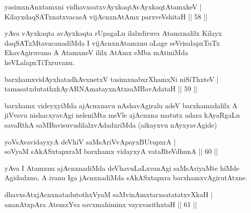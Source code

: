 \begin{shl}\footnotemark[2]yasimxnAnxtamxni vidhavxsatxvAyxkaqtAvAyxkaqtAtamxkeV |\\
KilayxdaqSATxnatxvacasA vijAcnxnAtAmx parxveVshitaH \hfill || 58 ||
\end{shl}

\begin{artha}
 yAva vAyxkaqta avAyxkaqta rUpagaLu ilalxdiruva Atamxnalilx Kilayx daqSATxMta\-vacanadiMda I vijAcnxnAtamxnu oLage seVrisalapxTuTx EkavAgiruvano A AtamxneV ililx AtAmx eMba mAtiniMda heVLalapxTiTxruvanu.
\end{artha}


\begin{shl}
barxhamxvidAyxhatadhAvxnetxV tasimxnabxrXhamxNi niSiThxteV |\\
tamasatxdutathxkAyARNAmatayxnAtxsaMBavAdataH \hfill || 59 ||
\end{shl}

\begin{artha}
barxhamx videyxyiMda ajAcnxnavu nAshavAgiralu adeV barxhamxdalilx A
jiVvavu nishacxyavAgi neleniMta meVle ajAcnxna matutx adara kAyaRgaLu
savaRthA saMBavisuvudilalxvAdadxriMda (aikayxvu nAyxyavAgide)
\end{artha}


\begin{shl}
yoV\s sAvavidayxyA deVhiV saMsAriVvApayxBUtupxrA |\\
soV\s yaM sAkASxtapxraM barxhamx vidayxyA vataRteV\s dhunA \hfill || 60 ||
\end{shl} 

\begin{artha}
yAva I Atamxnu ajAcnxnadiMda deVhavuLaLxvanAgi saMsAriyaMte hiMde Agidadxno, A ivanu Iga jAcnxnadiMda sAkASxtapxra barxhamxvAgirutAtxne.
\end{artha}


\begin{shl}
dhavxsAtxjAcnxnatadutothxVyaM saMvinAmxtarxsatatatxvXkaH |\\
ananAtxpAra AtemxYva savxmahiminx vayxvasithxtaH \hfill || 61 ||
\end{shl}

